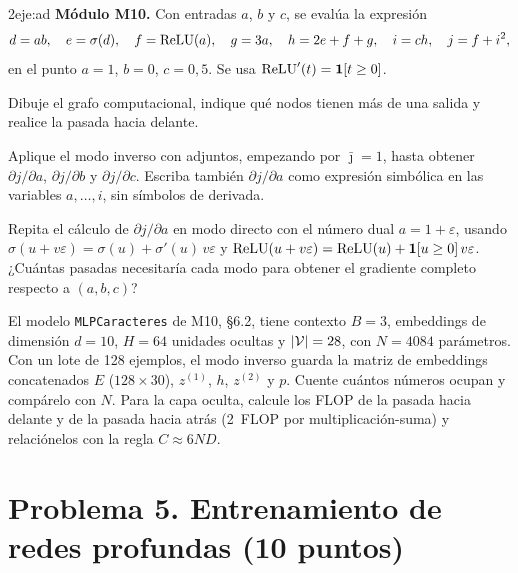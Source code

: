 \begin{ejercicio}{2}{eje:ad}
\textbf{Módulo M10.} Con entradas $a$, $b$ y $c$, se evalúa la expresión
\[
d=ab,\quad e=\sigma(d),\quad f=\operatorname{ReLU}(a),\quad g=3a,\quad h=2e+f+g,\quad i=ch,\quad j=f+i^{2},
\]
en el punto $a=1$, $b=0$, $c=0{,}5$. Se usa $\operatorname{ReLU}'(t)=\mathbf{1}[t\ge 0]$.
\begin{apartados}
  \item {} Dibuje el grafo computacional, indique qué nodos tienen más de una salida y realice la pasada hacia delante.
  \item {} Aplique el modo inverso con adjuntos, empezando por $\bar\jmath=1$, hasta obtener $\partial j/\partial a$, $\partial j/\partial b$ y $\partial j/\partial c$. Escriba también $\partial j/\partial a$ como expresión simbólica en las variables $a,\dots,i$, sin símbolos de derivada.
  \item {} Repita el cálculo de $\partial j/\partial a$ en modo directo con el número dual $a=1+\varepsilon$, usando $\sigma(u+v\varepsilon)=\sigma(u)+\sigma'(u)\,v\varepsilon$ y $\operatorname{ReLU}(u+v\varepsilon)=\operatorname{ReLU}(u)+\mathbf{1}[u\ge 0]\,v\varepsilon$. ¿Cuántas pasadas necesitaría cada modo para obtener el gradiente completo respecto a $(a,b,c)$?
  \item {} El modelo \texttt{MLPCaracteres} de M10, §6.2, tiene contexto $B=3$, embeddings de dimensión $d=10$, $H=64$ unidades ocultas y $\lvert\mathcal{V}\rvert=28$, con $N=4084$ parámetros. Con un lote de 128 ejemplos, el modo inverso guarda la matriz de embeddings concatenados $E$ ($128\times 30$), $z^{(1)}$, $h$, $z^{(2)}$ y $p$. Cuente cuántos números ocupan y compárelo con $N$. Para la capa oculta, calcule los FLOP de la pasada hacia delante y de la pasada hacia atrás (2~FLOP por multiplicación-suma) y relaciónelos con la regla $C\approx 6ND$.
\end{apartados}
\end{ejercicio}

\section*{Problema 5. Entrenamiento de redes profundas (10 puntos)}

